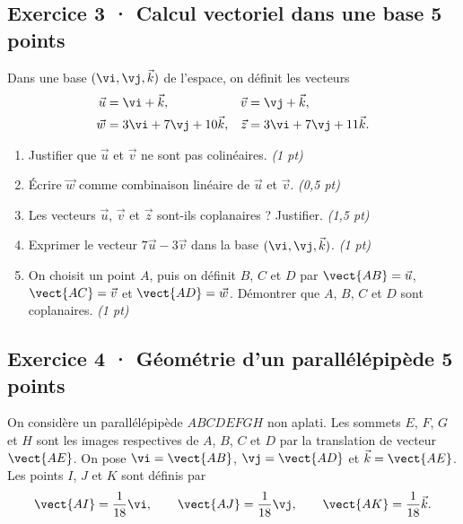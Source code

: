 \clearpage{}\par

\subsection*{Exercice 3 · Calcul vectoriel dans une base \hfill 5 points}Dans une base $(\vi,\vj,\vec k)$ de l'espace, on définit les vecteurs
\[\begin{aligned}\vec u&=\vi+\vec k,&\vec v&=\vj+\vec k,\\
\vec w&=3\vi+7\vj+10\vec k,&\vec z&=3\vi+7\vj+11\vec k.\end{aligned}\]

\begin{enumerate}

\item Justifier que $\vec u$ et $\vec v$ ne sont pas colinéaires. \hfill\textit{(1 pt)}

\item Écrire $\vec w$ comme combinaison linéaire de $\vec u$ et $\vec v$. \hfill\textit{(0,5 pt)}

\item Les vecteurs $\vec u$, $\vec v$ et $\vec z$ sont-ils coplanaires ? Justifier. \hfill\textit{(1,5 pt)}

\item Exprimer le vecteur $7\vec u-3\vec v$ dans la base $(\vi,\vj,\vec k)$. \hfill\textit{(1 pt)}

\item On choisit un point $A$, puis on définit $B$, $C$ et $D$ par $\vect{AB}=\vec u$, $\vect{AC}=\vec v$ et $\vect{AD}=\vec w$. Démontrer que $A$, $B$, $C$ et $D$ sont coplanaires. \hfill\textit{(1 pt)}

\end{enumerate}

\subsection*{Exercice 4 · Géométrie d'un parallélépipède \hfill 5 points}On considère un parallélépipède $ABCDEFGH$ non aplati. Les sommets $E$, $F$, $G$ et $H$ sont les images respectives de $A$, $B$, $C$ et $D$ par la translation de vecteur $\vect{AE}$.
On pose $\vi=\vect{AB}$, $\vj=\vect{AD}$ et $\vec k=\vect{AE}$.
Les points $I$, $J$ et $K$ sont définis par
\[\vect{AI}=\frac1{18}\vi,\qquad\vect{AJ}=\frac1{18}\vj,\qquad\vect{AK}=\frac1{18}\vec k.\]

